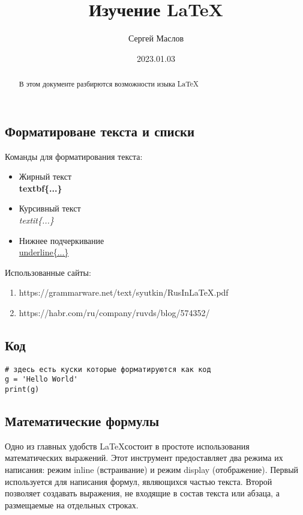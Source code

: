 \documentclass[12pt]{article}        %
\title{Изучение \LaTeX} %
\author{Сергей Маслов}  %
\date{2023.01.03}       %
\begin{document}
\maketitle %

\begin{abstract}
В этом документе разбирются возможности изыка \LaTeX
\end{abstract}

\tableofcontents

\subsection{Форматироване текста и списки}
Команды для форматирования текста:
\begin{itemize} %
    \item Жирный текст \textbf{\\textbf\{...\}}
    \item Курсивный текст \textit{\\textit\{...\}}
    \item Нижнее подчеркивание \underline{\\underline\{...\}}
\end{itemize}

Использованные сайты:
\begin{enumerate} %
    \item https://grammarware.net/text/syutkin/RusInLaTeX.pdf
    \item https://habr.com/ru/company/ruvds/blog/574352/
\end{enumerate}

\subsection{Код}
\begin{verbatim}
# здесь есть куски которые форматируются как код
g = 'Hello World'
print(g)
\end{verbatim}

\subsection{Математические формулы}
Одно из главных удобств \LaTeX состоит в простоте использования математических выражений.
Этот инструмент предоставляет два режима их написания: режим inline (встраивание) и режим display (отображение). Первый используется для написания формул, являющихся частью текста. Второй позволяет создавать выражения, не входящие в состав текста или абзаца, а размещаемые на отдельных строках.
\end{document}
